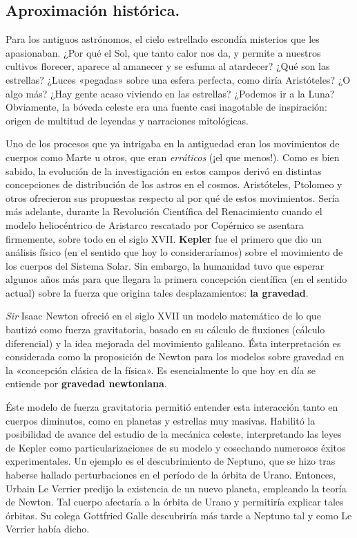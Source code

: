 \documentclass[11pt,a4paper,titlepage]{article}
\begin{document}
\subsection{Aproximación histórica.}
\par Para los antiguos astrónomos, el cielo estrellado escondía misterios que les apasionaban. ¿Por qué el Sol, que tanto calor nos da, y permite a nuestros cultivos florecer, aparece al amanecer y se esfuma al atardecer? ¿Qué son las estrellas? ¿Luces «pegadas» sobre una esfera perfecta, como diría Aristóteles? ¿O algo más? ¿Hay gente acaso viviendo en las estrellas? ¿Podemos ir a la Luna? Obviamente, la bóveda celeste era una fuente casi inagotable de inspiración: origen de multitud de leyendas y narraciones mitológicas.
\\ \par Uno de los procesos que ya intrigaba en la antiguedad eran los movimientos de cuerpos como Marte u otros, que eran \textit{erráticos} (¡el que menos!). Como es bien sabido, la evolución de la investigación en estos campos derivó en distintas concepciones de distribución de los astros en el cosmos. Aristóteles, Ptolomeo y otros ofrecieron sus propuestas respecto al por qué de estos movimientos. Sería más adelante, durante la Revolución Científica del Renacimiento cuando el modelo heliocéntrico de Aristarco rescatado por Copérnico se asentara firmemente, sobre todo en el siglo XVII. \textbf{Kepler} fue el primero que dio un análisis físico (en el sentido que hoy lo consideraríamos) sobre el movimiento de los cuerpos del Sistema Solar. Sin embargo, la humanidad tuvo que esperar algunos años más para que llegara la primera concepción científica (en el sentido actual) sobre la fuerza que origina tales desplazamientos: \textbf{la gravedad}.
\\\par \textit{Sir} Isaac Newton ofreció en el siglo XVII un modelo matemático de lo que bautizó como fuerza gravitatoria, basado en su cálculo de fluxiones (cálculo diferencial) y la idea mejorada del movimiento galileano. Ésta interpretación es considerada como la proposición de Newton para los modelos sobre gravedad en la «concepción clásica de la física». Es esencialmente lo que hoy en día se entiende por \textbf{gravedad newtoniana}.
\par Éste modelo de fuerza gravitatoria permitió entender esta interacción tanto en cuerpos diminutos, como en planetas y estrellas muy masivas. Habilitó la posibilidad de avance del estudio de la mecánica celeste, interpretando las leyes de Kepler como particularizaciones de su modelo y cosechando numerosos éxitos experimentales. Un ejemplo es el descubrimiento de Neptuno, que se hizo tras haberse hallado perturbaciones en el período de la órbita de Urano. Entonces, Urbain Le Verrier predijo la existencia de un nuevo planeta, empleando la teoría de Newton. Tal cuerpo afectaría a la órbita de Urano y permitiría explicar tales órbitas. Su colega Gottfried Galle descubriría más tarde a Neptuno tal y como Le Verrier había dicho.
\end{document}
